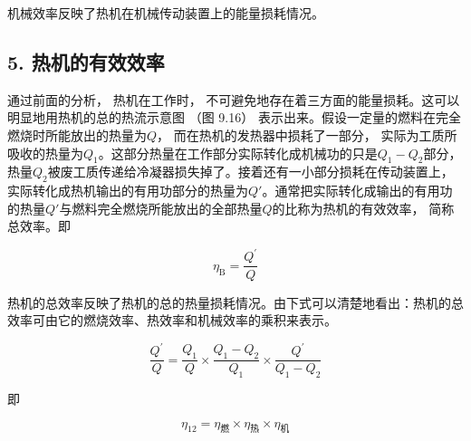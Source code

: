 机械效率反映了热机在机械传动装置上的能量损耗情况。

\subsection{5.
热机的有效效率}\label{ux70edux673aux7684ux6709ux6548ux6548ux7387}

通过前面的分析， 热机在工作时，
不可避免地存在着三方面的能量损耗。这可以明显地用热机的总的热流示意图
（图 9.16）
表示出来。假设一定量的燃料在完全燃烧时所能放出的热量为\(Q\)，
而在热机的发热器中损耗了一部分，
实际为工质所吸收的热量为\(Q_{1}\)。这部分热量在工作部分实际转化成机械功的只是\(Q_{1} - Q_{2}\)部分，
热量\(Q_{2}\)被废工质传递给冷凝器损失掉了。接着还有一小部分损耗在传动装置上，
实际转化成热机输出的有用功部分的热量为\(Q'\)。通常把实际转化成输出的有用功的热量\(Q'\)与燃料完全燃烧所能放出的全部热量\(Q\)的比称为热机的有效效率，
简称总效率。即

\[
\eta_ {\mathrm{B}} = \frac {Q ^ {\prime}}{Q} \tag {9.19}
\]

热机的总效率反映了热机的总的热量损耗情况。由下式可以清楚地看出：热机的总效率可由它的燃烧效率、热效率和机械效率的乘积来表示。

\[
\frac {Q ^ {\prime}}{Q} = \frac {Q _ {1}}{Q} \times \frac {Q _ {1} - Q _ {2}}{Q _ {1}} \times \frac {Q ^ {\prime}}{Q _ {1} - Q _ {2}}
\]

即

\[
\eta_ {12} = \eta_ {\text{燃}} \times \eta_ {\text{热}} \times \eta_ {\text{机}} \tag {9.20}
\]

